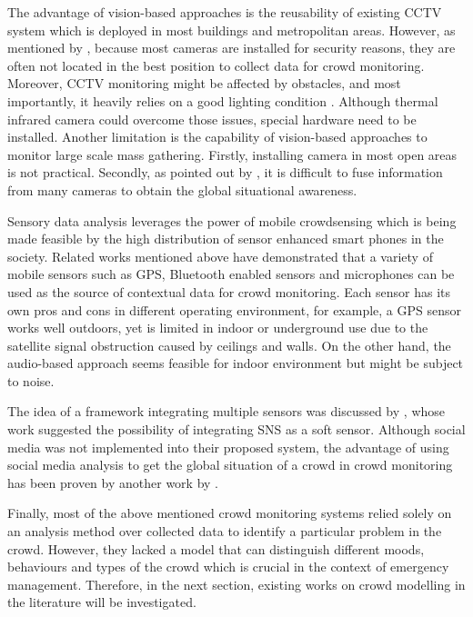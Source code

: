 The advantage of vision-based approaches is the reusability of existing CCTV system which is deployed in most buildings and metropolitan areas. However, as mentioned by \citet{Davies1995}, because most cameras are installed for security reasons, they are often not located in the best position to collect data for crowd monitoring. Moreover, CCTV monitoring might be affected by obstacles, and most importantly, it heavily relies on a good lighting condition \citep{Wirz2012}. Although thermal infrared camera could overcome those issues, special hardware need to be installed. Another limitation is the capability of vision-based approaches to monitor large scale mass gathering. Firstly, installing camera in most open areas is not practical. Secondly, as pointed out by \citet{Wirz2012}, it is difficult to fuse information from many cameras to obtain the global situational awareness.

Sensory data analysis leverages the power of mobile crowdsensing which is being made feasible by the high distribution of sensor enhanced smart phones in the society. Related works mentioned above have demonstrated that a variety of mobile sensors such as GPS, Bluetooth enabled sensors and microphones can be used as the source of contextual data for crowd monitoring. Each sensor has its own pros and cons in different operating environment, for example, a GPS sensor works well outdoors, yet is limited in indoor or underground use due to the satellite signal obstruction caused by ceilings and walls. On the other hand, the audio-based approach seems feasible for indoor environment but might be subject to noise.

The idea of a framework integrating multiple sensors was discussed by \citet{Ramesh2014}, whose work suggested the possibility of integrating SNS as a soft sensor. Although social media was not implemented into their proposed system, the advantage of using social media analysis to get the global situation of a crowd in crowd monitoring has been proven by another work by \citet{DelirHaghighi2013}.

Finally, most of the above mentioned crowd monitoring systems relied solely on an analysis method over collected data to identify a particular problem in the crowd. However, they lacked a model that can distinguish different moods, behaviours and types of the crowd which is crucial in the context of emergency management. Therefore, in the next section, existing works on crowd modelling in the literature will be investigated.

